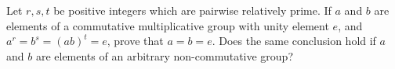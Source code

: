 \documentclass{article}
\begin{document}
\setlength{\parindent}{0pt}
Let $r,s,t$ be positive integers which are pairwise relatively prime. If $a$ and $b$ are elements of a commutative multiplicative group with unity element $e$, and $a^{r}=b^{s}=(ab)^{t}=e$, prove that $a=b=e$.\newline
Does the same conclusion hold if $a$ and $b$ are elements of an arbitrary non-commutative group?
\end{document}

